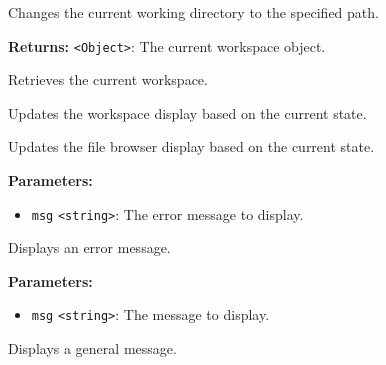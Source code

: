 \documentclass[12pt,a4paper]{article}
\begin{document}
\noindent Changes the current working directory to the specified path.

\vspace{5mm}
\noindent {}


\noindent \textbf{Returns:} \texttt{<Object>}: The current workspace object.

\noindent Retrieves the current workspace.

\vspace{5mm}
\noindent {}


\noindent Updates the workspace display based on the current state.

\vspace{5mm}
\noindent {}


\noindent Updates the file browser display based on the current state.

\vspace{5mm}
\noindent {}


\noindent \textbf{Parameters:}
\begin{itemize}
  \item \texttt{msg} \texttt{<string>}: The error message to display.
\end{itemize}

\noindent Displays an error message.

\vspace{5mm}
\noindent {}


\noindent \textbf{Parameters:}
\begin{itemize}
  \item \texttt{msg} \texttt{<string>}: The message to display.
\end{itemize}

\noindent Displays a general message.
\end{document}
